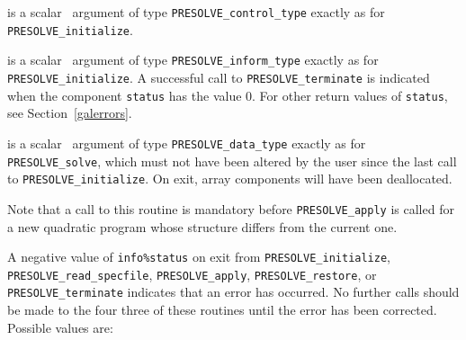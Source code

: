 \documentclass{galahad}
\newcommand{\packagename}{PRESOLVE}
\begin{document}
\begin{description}
 is a scalar \intentin\ argument of type 
{\tt \packagename\_control\_type}
exactly as for
{\tt \packagename\_initialize}.

 is a scalar \intentout\ argument of type
{\tt \packagename\_inform\_type}
exactly as for
{\tt \packagename\_initialize}.
A successful call to {\tt \packagename\_terminate}
is indicated when the component {\tt status} has the value 0. 
For other return values of {\tt status}, see Section~\ref{galerrors}.

 is a scalar \intentinout\ argument of type 
{\tt \packagename\_data\_type} 
exactly as for
{\tt \packagename\_solve},
which must not have been altered by the user since the last call to 
{\tt \packagename\_initialize}.
On exit, array components will have been deallocated.
\end{description}

\noindent
Note that a call to this routine is mandatory before {\tt \packagename\_apply}
is called for a new quadratic program whose structure differs from the current
one.
 

\galerrors
A negative value of {\tt info\%status} on exit from 
{\tt \packagename\_initialize},
{\tt \packagename\_read\_specfile},
{\tt \packagename\_apply},
{\tt \packagename\_restore},
or 
{\tt \packagename\_terminate}
indicates that an error has occurred. No further calls should be made
to the four three of these routines until the error has been
corrected. Possible values are:
\end{document}
